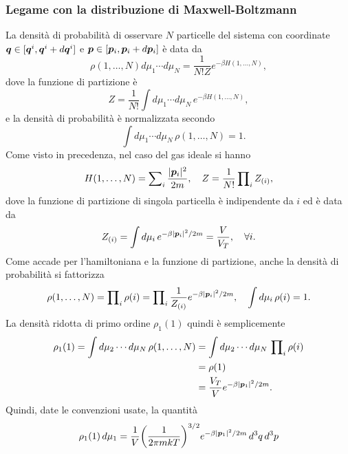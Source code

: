 \subsubsection{Legame con la distribuzione di Maxwell-Boltzmann}
La densità di probabilità di osservare $N$ particelle del sistema con coordinate $\bm{q}\in[\bm{q}^i,\bm{q}^i + d\bm{q}^i]$ e $\bm{p}\in[\bm{p}_i,\bm{p}_i +d\bm{p}_i]$ è data da
\begin{equation}
    \rho(1,\dots,N)d\mu_1\cdots d\mu_N = \frac{1}{N!Z}e^{-\beta H(1,\dots,N)},
\end{equation}
dove la funzione di partizione è
\begin{equation}
     Z = \frac{1}{N!}\int d\mu_1\cdots d\mu_N\,e^{-\beta H(1,\dots,N)},
\end{equation}
e la densità di probabilità è normalizzata secondo
\begin{equation}
    \quad \int d\mu_1\cdots d\mu_N\,\rho(1,\dots,N) = 1.
\end{equation}
Come visto in precedenza, nel caso del gas ideale si hanno
\begin{equation}
    H(1,\dots,N) = \sum\nolimits_i\frac{|\bm{p}_i|^2}{2m},\quad Z = \frac{1}{N!}\prod\nolimits_i Z_{(i)},
\end{equation}
dove la funzione di partizione di singola particella è indipendente da $i$ ed è data da
\begin{equation}
    Z_{(i)} = \int d\mu_i\,e^{-\beta|\bm{p}_i|^2/2m} = \frac{V}{V_T},\quad \forall i.
\end{equation}
Come accade per l'hamiltoniana e la funzione di partizione, anche la densità di probabilità si fattorizza
\begin{equation}
    \rho(1,\dots,N) = \prod\nolimits_i\rho(i) = \prod\nolimits_i\frac{1}{Z_{(i)}}e^{-\beta|\bm{p}_i|^2/2m},\quad \int d\mu_i\,\rho(i) = 1.
\end{equation}
La densità ridotta di primo ordine $\rho_1(1)$ quindi è semplicemente
\begin{equation}
    \begin{split}
        \rho_1(1) = \int d\mu_2\cdots d\mu_N\,\rho(1,\dots,N) &= \int d\mu_2\cdots d\mu_N\,\prod\nolimits_i\rho(i) \\
        &= \rho(1) \\
        &= \frac{V_T}{V}e^{-\beta|\bm{p}_1|^2/2m}.
    \end{split}
\end{equation}
Quindi, date le convenzioni usate, la quantità
\begin{equation}
    \rho_1(1)\,d\mu_1 = \frac{1}{V}\bigg(\frac{1}{2\pi mkT}\bigg)^{3/2}e^{-\beta|\bm{p}_1|^2/2m}\,d^3q\,d^3p
\end{equation}
